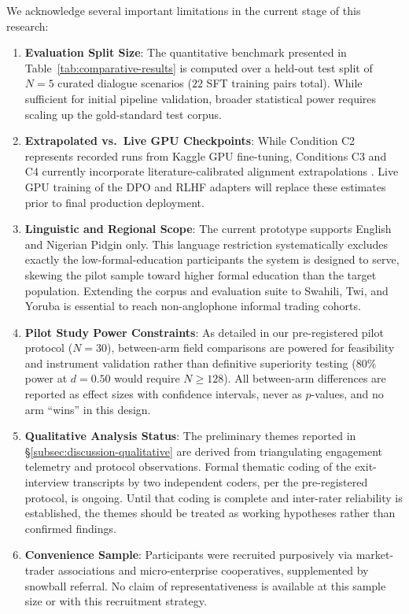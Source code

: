 We acknowledge several important limitations in the current stage of this research:
\begin{enumerate}
    \item \textbf{Evaluation Split Size}: The quantitative benchmark presented in Table~\ref{tab:comparative-results} is computed over a held-out test split of $N=5$ curated dialogue scenarios ($22$ SFT training pairs total). While sufficient for initial pipeline validation, broader statistical power requires scaling up the gold-standard test corpus.
    \item \textbf{Extrapolated vs.\ Live GPU Checkpoints}: While Condition C2 represents recorded runs from Kaggle GPU fine-tuning, Conditions C3 and C4 currently incorporate literature-calibrated alignment extrapolations \citep{rafailov2023dpo,ouyang2022instructgpt}. Live GPU training of the DPO and RLHF adapters will replace these estimates prior to final production deployment.
    \item \textbf{Linguistic and Regional Scope}: The current prototype supports English and Nigerian Pidgin only. This language restriction systematically excludes exactly the low-formal-education participants the system is designed to serve, skewing the pilot sample toward higher formal education than the target population. Extending the corpus and evaluation suite to Swahili, Twi, and Yoruba is essential to reach non-anglophone informal trading cohorts.
    \item \textbf{Pilot Study Power Constraints}: As detailed in our pre-registered pilot protocol ($N=30$), between-arm field comparisons are powered for feasibility and instrument validation rather than definitive superiority testing ($80\%$ power at $d = 0.50$ would require $N \ge 128$). All between-arm differences are reported as effect sizes with confidence intervals, never as $p$-values, and no arm ``wins'' in this design.
    \item \textbf{Qualitative Analysis Status}: The preliminary themes reported in \S\ref{subsec:discussion-qualitative} are derived from triangulating engagement telemetry and protocol observations. Formal thematic coding of the exit-interview transcripts by two independent coders, per the pre-registered protocol, is ongoing. Until that coding is complete and inter-rater reliability is established, the themes should be treated as working hypotheses rather than confirmed findings.
    \item \textbf{Convenience Sample}: Participants were recruited purposively via market-trader associations and micro-enterprise cooperatives, supplemented by snowball referral. No claim of representativeness is available at this sample size or with this recruitment strategy.

\end{enumerate}

